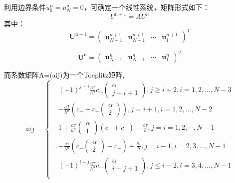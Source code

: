 利用边界条件$u_{0}^{n}=u_{N}^{n}=0$，可确定一个线性系统，矩阵形式如下：
\begin{equation}
U^{\mathrm{n}+1}=A U^{n}
\end{equation}
其中：
\begin{equation*}
\boldsymbol{U}^{\mathrm{n}+1}=\left(\begin{array}{cccc}{\boldsymbol{u}_{N-1}^{n+1}} & {\boldsymbol{u}_{N-1}^{n+1}} & {\cdots} & {\boldsymbol{u}_{1}^{n+1}}\end{array}\right)^{T}
\end{equation*}

\begin{equation*}
\boldsymbol{U}^{\mathrm{n}}=\left( \begin{array}{llll}{\boldsymbol{u}_{N-1}^{n}} & {\boldsymbol{u}_{N-1}^{n}} & {\cdots} & {\boldsymbol{u}_{1}^{n}}\end{array}\right)^{T}
\end{equation*}


而系数矩阵A=(aij)为一个Toeplitz矩阵,	
\begin{equation*}
	aij=\left\{
	\begin{aligned}
	& (-1)^{j-i} \frac{a \tau}{h^{\alpha}} c_{-} \left( \begin{array}{c}{\alpha} \\ {j-i+1}\end{array}\right),
	j \geq i+2, i=1,2, \dots, N-3
	\\
	& -\frac{a T}{h^{\alpha}}\left(c_{+}+c_{-} \left( \begin{array}{l}{\alpha} \\ {2}\end{array}\right)\right),j=i+1, i=1,2, \dots, N-2 
	\\
	& 1+\frac{a \tau}{h^{\alpha}} \left( \begin{array}{l}{\alpha} \\ {1}\end{array}\right)\left(c_{+}+c_{-}\right)-\frac{b \tau}{h},j=i=1,2, \cdots, N-1 
	\\
	& -\frac{a \tau}{h^{\alpha}}\left(c_{+} \left( \begin{array}{l}{\alpha} \\ {2}\end{array}\right)+c_{-}\right)+\frac{b \tau}{h},j=i-1, i=2,3, \dots, N-1
	\\
	& (-1)^{i-j} \frac{a \tau}{h^{\alpha}} c_{+} \left( \begin{array}{c}{\alpha} \\ {i-j+1}\end{array}\right),j \leq i-2, i=3,4, \dots, N-1
	\\
	\end{aligned}
	\right.	
\end{equation*}

